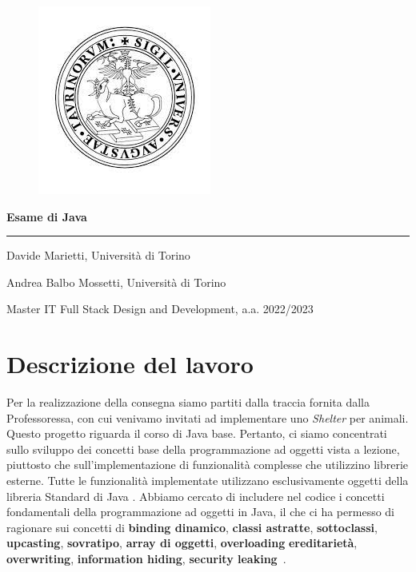\documentclass[a4paper,11pt]{article}
\newcommand{\linia}{\rule{\linewidth}{0.5pt}}
\begin{document}
\begin{figure}
    \centering
    \includegraphics[width=0.25\linewidth]{immagini/unito_logo.jpg}
\end{figure}

\begin{center}
    \vspace{5ex}
    {\huge \textbf{Esame di Java}}
    \vspace{1ex}
    \linia
    \vspace{3ex}
\end{center}

\begin{center}
 Davide Marietti, Università di Torino
\end{center}
\begin{center}
    Andrea Balbo Mossetti, Università di Torino
\end{center}

\vspace{5ex}

\begin{center}
    Master IT Full Stack Design and Development, a.a. 2022/2023

\end{center}

\newpage
	\tableofcontents
    \lstlistoflistings
	
\newpage


\section{Descrizione del lavoro}

Per la realizzazione della consegna siamo partiti dalla traccia fornita dalla Professoressa, con cui venivamo invitati ad implementare uno \textit{Shelter} per animali. Questo progetto riguarda il corso di Java base. Pertanto, ci siamo concentrati sullo sviluppo dei concetti base della programmazione ad oggetti vista a lezione, piuttosto che sull'implementazione di funzionalità complesse che utilizzino librerie esterne. Tutte le funzionalità implementate utilizzano esclusivamente oggetti della libreria Standard di Java \cite{java_lib}. Abbiamo cercato di includere nel codice i concetti fondamentali della programmazione ad oggetti in Java, il che ci ha permesso di ragionare sui concetti di \textbf{binding dinamico}, \textbf{classi astratte}, \textbf{sottoclassi}, \textbf{upcasting}, \textbf{sovratipo}, \textbf{array di oggetti}, \textbf{overloading} \textbf{ereditarietà}, \textbf{overwriting}, \textbf{information hiding}, \textbf{security leaking}~\cite{java}\cite{java_book}.
\end{document}
